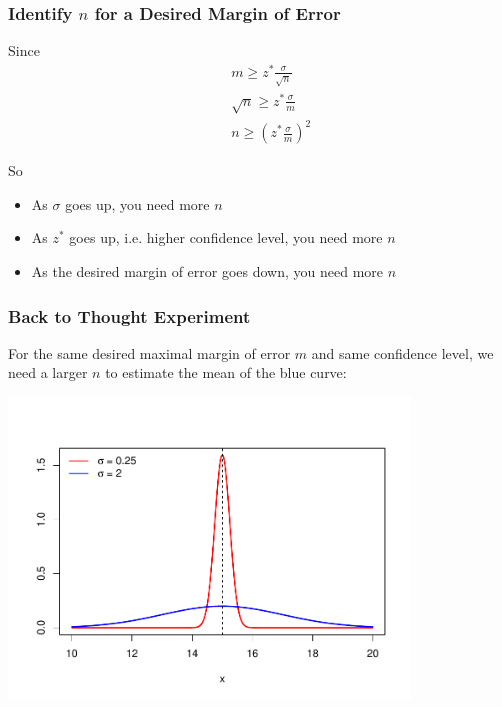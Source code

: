 \documentclass[handout]{beamer}
\begin{document}
\begin{frame}
\frametitle{Identify $n$ for a Desired Margin of Error}
%
%
Since
\begin{eqnarray*}
&&m \geq z^*\frac{\sigma}{\sqrt{n}}\\
&& \sqrt{n} \geq z^*\frac{\sigma}{m}\\
&& n \geq \left(z^*\frac{\sigma}{m}\right)^2
\end{eqnarray*}
\vspace{0.25cm}\pause

So
\begin{itemize}
\pause\item As $\sigma$ goes up, you need more $n$
\pause\item As $z^*$ goes up, i.e. higher confidence level, you need more $n$
\pause\item As the desired margin of error goes down, you need more $n$
\end{itemize}

\end{frame}


\begin{frame}
\frametitle{Back to Thought Experiment}
For the same desired maximal margin of error $m$ and same confidence level, we need a larger $n$ to estimate the mean of the blue curve:
\begin{center}
\includegraphics[width=0.8\textwidth]{figure/norm.pdf}
\end{center}
\end{frame}
\end{document}
